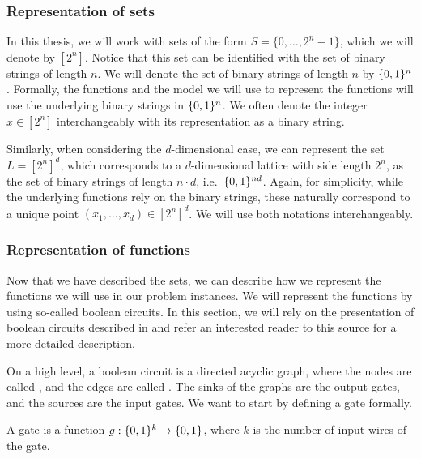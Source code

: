 \subsubsection{Representation of sets}

In this thesis, we will work with sets of the form $S = \{0, \dots, 2^n - 1\}$, which we will denote by $[2^n]$. Notice that this set can be identified with the set of binary strings of length $n$. We will denote the set of binary strings of length $n$ by $\{0, 1\}^n$. Formally, the functions and the model we will use to represent the functions will use the underlying binary strings in $\{0, 1\}^n$. We often denote the integer $x \in [2^n]$ interchangeably with its representation as a binary string.

Similarly, when considering the $d$-dimensional case, we can represent the set $L = [2^n]^d$, which corresponds to a $d$-dimensional lattice with side length $2^n$, as the set of binary strings of length $n \cdot d$, i.e.\ $\{0, 1\}^{nd}$. Again, for simplicity, while the underlying functions rely on the binary strings, these naturally correspond to a unique point $(x_1, \dots, x_d) \in [2^n]^d$. We will use both notations interchangeably.

\subsubsection{Representation of functions}

Now that we have described the sets, we can describe how we represent the functions we will use in our problem instances. We will represent the functions by using so-called boolean circuits. In this section, we will rely on the presentation of boolean circuits described in  and refer an interested reader to this source for a more detailed description.

On a high level, a boolean circuit is a directed acyclic graph, where the nodes are called , and the edges are called . The sinks of the graphs are the output gates, and the sources are the input gates. We want to start by defining a gate formally.

\begin{definition}[Gate]
	A gate is a function $g : \{0, 1\}^k \rightarrow \{0, 1\}$, where $k$ is the number of input wires of the gate.
\end{definition}

